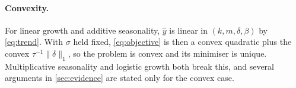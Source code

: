 \paragraph{Convexity.}
For linear growth and additive seasonality, $\hat y$ is linear in
$(k, m, \delta, \beta)$ by \eqref{eq:trend}. With $\sigma$ held fixed,
\eqref{eq:objective} is then a convex quadratic plus the convex
$\tau^{-1}\lVert\delta\rVert_1$, so the problem is convex and its minimiser is
unique. Multiplicative seasonality and logistic growth both break this, and
several arguments in \cref{sec:evidence} are stated only for the convex case.
